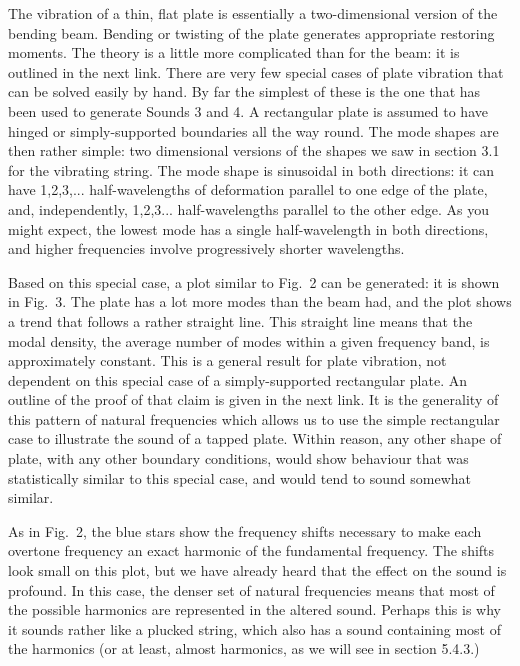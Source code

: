   The vibration of a thin, flat plate is essentially a two-dimensional version 
  of the bending beam. Bending or twisting of the plate generates appropriate 
  restoring moments. The theory is a little more complicated than for the beam: 
  it is outlined in the next link. There are very few special cases of plate 
  vibration that can be solved easily by hand. By far the simplest of these is 
  the one that has been used to generate Sounds 3 and 4. A rectangular plate is 
  assumed to have hinged or simply-supported boundaries all the way round. The 
  mode shapes are then rather simple: two dimensional versions of the shapes we 
  saw in section 3.1 for the vibrating string. The mode shape is sinusoidal in 
  both directions: it can have 1,2,3,... half-wavelengths of deformation 
  parallel to one edge of the plate, and, independently, 1,2,3... 
  half-wavelengths parallel to the other edge. As you might expect, the lowest 
  mode has a single half-wavelength in both directions, and higher frequencies 
  involve progressively shorter wavelengths. 


  Based on this special case, a plot similar to Fig.\ 2 can be generated: it is 
  shown in Fig.\ 3. The plate has a lot more modes than the beam had, and the 
  plot shows a trend that follows a rather straight line. This straight line 
  means that the modal density, the average number of modes within a given 
  frequency band, is approximately constant. This is a general result for plate 
  vibration, not dependent on this special case of a simply-supported 
  rectangular plate. An outline of the proof of that claim is given in the next 
  link. It is the generality of this pattern of natural frequencies which 
  allows us to use the simple rectangular case to illustrate the sound of a 
  tapped plate. Within reason, any other shape of plate, with any other 
  boundary conditions, would show behaviour that was statistically similar to 
  this special case, and would tend to sound somewhat similar. 

  As in Fig.\ 2, the blue stars show the frequency shifts necessary to make 
  each overtone frequency an exact harmonic of the fundamental frequency. The 
  shifts look small on this plot, but we have already heard that the effect on 
  the sound is profound. In this case, the denser set of natural frequencies 
  means that most of the possible harmonics are represented in the altered 
  sound. Perhaps this is why it sounds rather like a plucked string, which also 
  has a sound containing most of the harmonics (or at least, almost harmonics, 
  as we will see in section 5.4.3.) 

